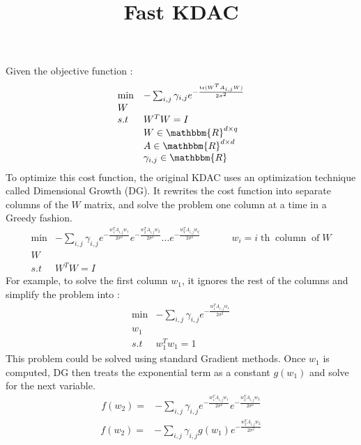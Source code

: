 \documentclass{article}
\newcommand{\tmop}[1]{\ensuremath{\operatorname{#1}}}
\begin{document}
\title{Fast KDAC}
\author{}
\maketitle

Given the objective function :
\begin{equation}
  \begin{array}{ll}
    \min & - \sum_{i, j} \gamma_{i, j} e^{- \frac{\tmop{tr} ( W^T A_{i, j}
    W)}{2 \sigma^2}}\\
    W & \\
    s.t & W^T W = I\\
    & W \in \mathbbm{R}^{d \times q}\\
    & A \in \mathbbm{R}^{d \times d}\\
    & \gamma_{i, j} \in \mathbbm{R}
  \end{array}
\end{equation}
To optimize this cost function, the original KDAC uses an optimization
technique called Dimensional Growth (DG). It rewrites the cost function into
separate columns of the $W$ matrix, and solve the problem one column at a time
in a Greedy fashion.
\[ \begin{array}{llllll}
     \min & - \sum_{i, j} \gamma_{i, j} e^{- \frac{w_1^T A_{i, j} w_1}{2
     \sigma^2}} e^{- \frac{w_2^T A_{i, j} w_2}{2 \sigma^2}} \ldots e^{-
     \frac{w_q^T A_{i, j} w_q}{2 \sigma^2}} &  &  &  & w_i = i \tmop{th}
     \tmop{column} \tmop{of} W\\
     W &  &  &  &  & \\
     s.t & W^T W = I &  &  &  & 
   \end{array} \]
For example, to solve the first column $w_1$, it ignores the rest of the
columns and simplify the problem into :
\[ \begin{array}{ll}
     \min & - \sum_{i, j} \gamma_{i, j} e^{- \frac{w_1^T A_{i, j} w_1}{2
     \sigma^2}}\\
     w_1 & \\
     s.t & w_1^T w_1 = 1
   \end{array} \]
This problem could be solved using standard Gradient methods. Once $w_1$ is
computed, DG then treats the exponential term as a constant $g ( w_1)$ and
solve for the next variable.
\[ \begin{array}{ll}
     f ( w_2) = & - \sum_{i, j} \gamma_{i, j} e^{- \frac{w_1^T A_{i, j} w_1}{2
     \sigma^2}} e^{- \frac{w_2^T A_{i, j} w_2}{2 \sigma^2}}
   \end{array} \]
\[ \begin{array}{ll}
     f ( w_2) = & - \sum_{i, j} \gamma_{i, j} g ( w_1) e^{- \frac{w_2^T A_{i,
     j} w_2}{2 \sigma^2}}
   \end{array} \]
\end{document}
